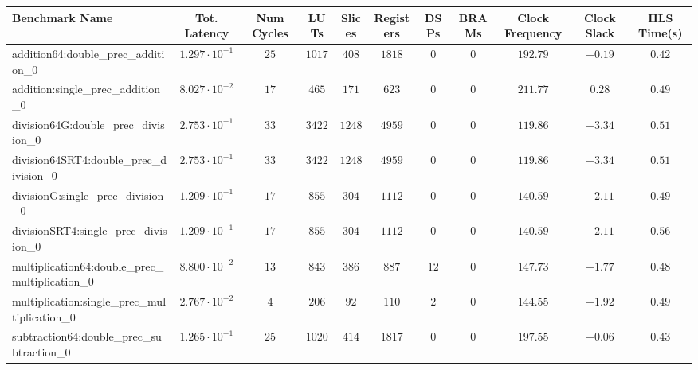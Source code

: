 \begin{tabular}{|l|c|c|c|c|c|c|c|c|c|c|}
\hline
Benchmark Name                                   & Tot. Latency            & Num Cycles & LUTs      & Slices   & Registers & DSPs   & BRAMs & Clock Frequency & Clock Slack & HLS Time(s) \\
\hline
addition64:double\_prec\_addition\_0             & $ 1.297 \cdot 10^{-1} $ & $ 25     $ & $ 1017  $ & $ 408  $ & $ 1818  $ & $ 0  $ & $ 0 $ & $ 192.79      $ & $ -0.19   $ & $ 0.42    $ \\
addition:single\_prec\_addition\_0               & $ 8.027 \cdot 10^{-2} $ & $ 17     $ & $ 465   $ & $ 171  $ & $ 623   $ & $ 0  $ & $ 0 $ & $ 211.77      $ & $ 0.28    $ & $ 0.49    $ \\
division64G:double\_prec\_division\_0            & $ 2.753 \cdot 10^{-1} $ & $ 33     $ & $ 3422  $ & $ 1248 $ & $ 4959  $ & $ 0  $ & $ 0 $ & $ 119.86      $ & $ -3.34   $ & $ 0.51    $ \\
division64SRT4:double\_prec\_division\_0         & $ 2.753 \cdot 10^{-1} $ & $ 33     $ & $ 3422  $ & $ 1248 $ & $ 4959  $ & $ 0  $ & $ 0 $ & $ 119.86      $ & $ -3.34   $ & $ 0.51    $ \\
divisionG:single\_prec\_division\_0              & $ 1.209 \cdot 10^{-1} $ & $ 17     $ & $ 855   $ & $ 304  $ & $ 1112  $ & $ 0  $ & $ 0 $ & $ 140.59      $ & $ -2.11   $ & $ 0.49    $ \\
divisionSRT4:single\_prec\_division\_0           & $ 1.209 \cdot 10^{-1} $ & $ 17     $ & $ 855   $ & $ 304  $ & $ 1112  $ & $ 0  $ & $ 0 $ & $ 140.59      $ & $ -2.11   $ & $ 0.56    $ \\
multiplication64:double\_prec\_multiplication\_0 & $ 8.800 \cdot 10^{-2} $ & $ 13     $ & $ 843   $ & $ 386  $ & $ 887   $ & $ 12 $ & $ 0 $ & $ 147.73      $ & $ -1.77   $ & $ 0.48    $ \\
multiplication:single\_prec\_multiplication\_0   & $ 2.767 \cdot 10^{-2} $ & $ 4      $ & $ 206   $ & $ 92   $ & $ 110   $ & $ 2  $ & $ 0 $ & $ 144.55      $ & $ -1.92   $ & $ 0.49    $ \\
subtraction64:double\_prec\_subtraction\_0       & $ 1.265 \cdot 10^{-1} $ & $ 25     $ & $ 1020  $ & $ 414  $ & $ 1817  $ & $ 0  $ & $ 0 $ & $ 197.55      $ & $ -0.06   $ & $ 0.43    $ \\

\end{tabular}
